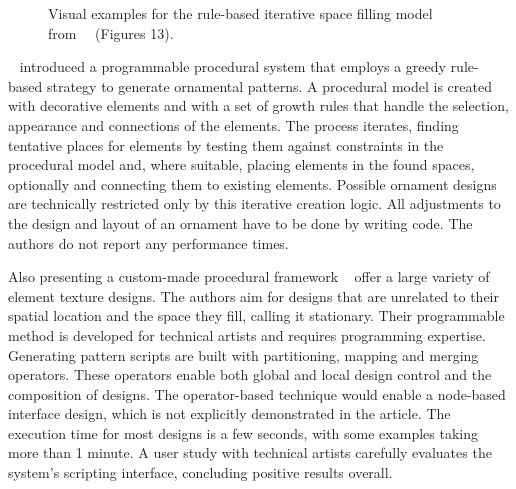 \begin{figure}[H]
    \centering
    \caption{\label{fig:wong_1998_cgf}Visual examples for the rule-based iterative space filling model from~\citeauthor*{wong_1998_cgf}~\cite{wong_1998_cgf} (Figures 13).\color{orange}{Status rights: ACM requested.}}
\end{figure}


\citeauthor*{wong_1998_cgf}~\cite{wong_1998_cgf} introduced a programmable procedural system that employs a greedy rule-based strategy to generate ornamental patterns. A procedural model is created with decorative elements and with a set of growth rules that handle the selection, appearance and connections of the elements. The process iterates, finding tentative places for elements by testing them against constraints in the procedural model and, where suitable, placing elements in the found spaces, optionally and connecting them to existing elements. Possible ornament designs are technically restricted only by this iterative creation logic. All adjustments to the design and layout of an ornament have to be done by writing code. The authors do not report any performance times.

 Also presenting a custom-made procedural framework \citeauthor*{loi_2017_pae}~\cite{loi_2017_pae} offer a large variety of element texture designs. The authors aim for designs that are unrelated to their spatial location and the space they fill, calling it stationary. Their programmable method is developed for technical artists and requires programming expertise. Generating pattern scripts are built with partitioning, mapping and merging operators. These operators enable both global and local design control and the composition of designs. The operator-based technique would enable a node-based interface design, which is not explicitly demonstrated in the article. The execution time for most designs is a few seconds, with some examples taking more than 1 minute. A user study with technical artists carefully evaluates the system's scripting interface, concluding positive results overall.

